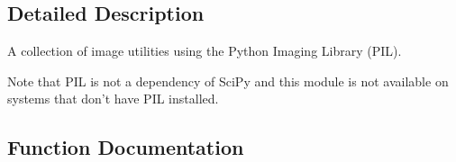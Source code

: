 \subsection{Detailed Description}
\begin{DoxyVerb}A collection of image utilities using the Python Imaging Library (PIL).

Note that PIL is not a dependency of SciPy and this module is not
available on systems that don't have PIL installed.\end{DoxyVerb}
 

\subsection{Function Documentation}
\hypertarget{namespacescipy_1_1misc_1_1pilutil_a72e0567166cb354ede5017d329e30c2c}{}
